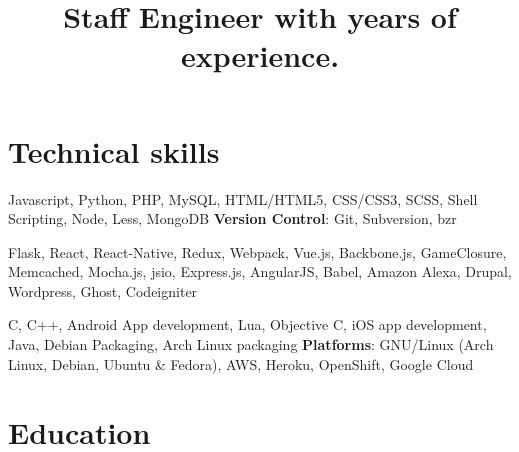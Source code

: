 \documentclass[11pt,a4paper]{moderncv}
\title{Staff Engineer with \YExperience \Plus { } years of experience.}
\begin{document}
\maketitle

\section{Technical skills}
           {Javascript, Python, PHP, MySQL, HTML/HTML5, CSS/CSS3, SCSS, Shell Scripting, Node, Less, MongoDB}
           {\textbf{Version Control}: }
           {Git, Subversion, bzr}

           {Flask, React, React-Native, Redux, Webpack, Vue.js, Backbone.js, GameClosure, Memcached, Mocha.js, jsio, Express.js, AngularJS, Babel, Amazon Alexa, Drupal, Wordpress, Ghost, Codeigniter}

           {C, C++, Android App development, Lua, Objective C, iOS app development, Java, Debian Packaging, Arch Linux packaging}
           {\textbf{Platforms}: }
           {GNU/Linux (Arch Linux, Debian, Ubuntu \& Fedora), AWS, Heroku, OpenShift, Google Cloud}

\section{Education}

\pagebreak
\end{document}
